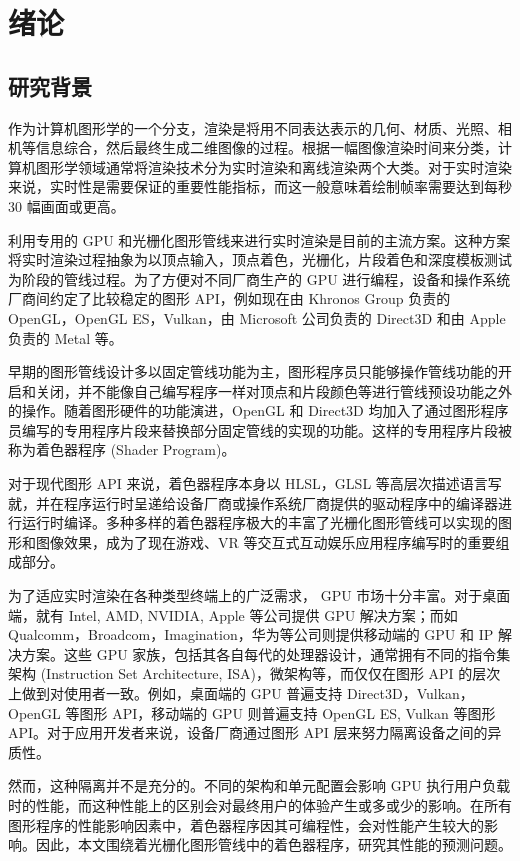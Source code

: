 
\chapter{绪论}

\section{研究背景}

作为计算机图形学的一个分支，渲染是将用不同表达表示的几何、材质、光照、相机等信息综合，然后最终生成二维图像的过程。根据一幅图像渲染时间来分类，计算机图形学领域通常将渲染技术分为实时渲染和离线渲染两个大类。对于实时渲染来说，实时性是需要保证的重要性能指标，而这一般意味着绘制帧率需要达到每秒 30 幅画面或更高。

利用专用的 GPU 和光栅化图形管线来进行实时渲染是目前的主流方案。这种方案将实时渲染过程抽象为以顶点输入，顶点着色，光栅化，片段着色和深度模板测试为阶段的管线过程。为了方便对不同厂商生产的 GPU 进行编程，设备和操作系统厂商间约定了比较稳定的图形 API，例如现在由 Khronos Group 负责的 OpenGL，OpenGL ES，Vulkan，由 Microsoft 公司负责的 Direct3D 和由 Apple 负责的 Metal 等。

早期的图形管线设计多以固定管线功能为主，图形程序员只能够操作管线功能的开启和关闭，并不能像自己编写程序一样对顶点和片段颜色等进行管线预设功能之外的操作。随着图形硬件的功能演进，OpenGL 和 Direct3D 均加入了通过图形程序员编写的专用程序片段来替换部分固定管线的实现的功能。这样的专用程序片段被称为着色器程序 (Shader Program)。

对于现代图形 API 来说，着色器程序本身以 HLSL，GLSL 等高层次描述语言写就，并在程序运行时呈递给设备厂商或操作系统厂商提供的驱动程序中的编译器进行运行时编译。多种多样的着色器程序极大的丰富了光栅化图形管线可以实现的图形和图像效果，成为了现在游戏、VR 等交互式互动娱乐应用程序编写时的重要组成部分。

为了适应实时渲染在各种类型终端上的广泛需求， GPU 市场十分丰富。对于桌面端，就有 Intel, AMD, NVIDIA, Apple 等公司提供 GPU 解决方案；而如 Qualcomm，Broadcom，Imagination，华为等公司则提供移动端的 GPU 和 IP 解决方案。这些 GPU 家族，包括其各自每代的处理器设计，通常拥有不同的指令集架构 (Instruction Set Architecture, ISA)，微架构等，而仅仅在图形 API 的层次上做到对使用者一致。例如，桌面端的 GPU 普遍支持 Direct3D，Vulkan，OpenGL 等图形 API，移动端的 GPU 则普遍支持 OpenGL ES, Vulkan 等图形 API。对于应用开发者来说，设备厂商通过图形 API 层来努力隔离设备之间的异质性。

然而，这种隔离并不是充分的。不同的架构和单元配置会影响 GPU 执行用户负载时的性能，而这种性能上的区别会对最终用户的体验产生或多或少的影响。在所有图形程序的性能影响因素中，着色器程序因其可编程性，会对性能产生较大的影响。因此，本文围绕着光栅化图形管线中的着色器程序，研究其性能的预测问题。

